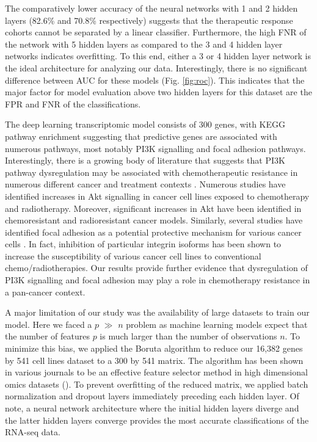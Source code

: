 \documentclass[10pt, letterpaper]{article}
\begin{document}
\begin{multicols}{2}
The comparatively lower accuracy of the neural networks with 1 and 2 hidden layers (82.6\% and 70.8\% respectively) suggests that the therapeutic response cohorts cannot be separated by a linear classifier. Furthermore, the high FNR of the network with 5 hidden layers as compared to the 3 and 4 hidden layer networks indicates overfitting. To this end, either a 3 or 4 hidden layer network is the ideal architecture for analyzing our data. Interestingly, there is no significant difference between AUC for these models (Fig. \ref{fig:roc}). This indicates that the major factor for model evaluation above two hidden layers for this dataset are the FPR and FNR of the classifications.

The deep learning transcriptomic model consists of 300 genes, with KEGG pathway enrichment suggesting that predictive genes are associated with numerous pathways, most notably PI3K signalling and focal adhesion pathways. Interestingly, there is a growing body of literature that suggests that PI3K pathway dysregulation may be associated with chemotherapeutic resistance in numerous different cancer and treatment contexts \cite{huang_2009}. Numerous studies have identified increases in Akt signalling in cancer cell lines exposed to chemotherapy and radiotherapy. Moreover, significant increases in Akt have been identified in chemoresistant and radioresistant cancer models. Similarly, several studies have identified focal adhesion as a potential protective mechanism for various cancer cells \cite{focal_adhesion}. In fact, inhibition of particular integrin isoforms has been shown to increase the susceptibility of various cancer cell lines to conventional chemo/radiotherapies. Our results provide further evidence that dysregulation of PI3K signalling and focal adhesion may play a role in chemotherapy resistance in a pan-cancer context. 

A major limitation of our study was the availability of large datasets to train our model. Here we faced a $p$ $\gg$ $n$ problem as machine learning models expect that the number of features $p$ is much larger than the number of observations $n$. To minimize this bias, we applied the Boruta algorithm to reduce our 16,382 genes by 541 cell lines dataset to a 300 by 541 matrix. The algorithm has been shown in various journals to be an effective feature selector method in high dimensional omics datasets (\cite{boruta}). To prevent overfitting of the reduced matrix, we applied batch normalization and dropout layers immediately preceding each hidden layer. Of note, a neural network architecture where the initial hidden layers diverge and the latter hidden layers converge provides the most accurate classifications of the RNA-seq data.


\end{multicols}
\end{document}
